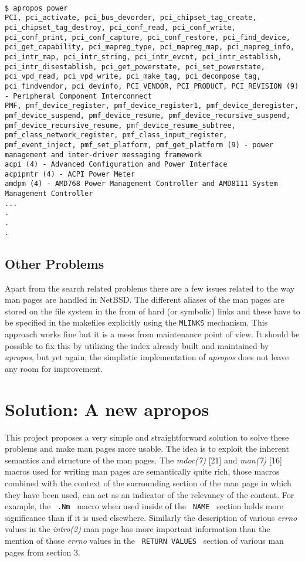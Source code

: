 \documentclass[letterpaper,twocolumn,10pt]{article}
\begin{document}
{\tt \small
{}
\begin{lstlisting}
$ apropos power
PCI, pci_activate, pci_bus_devorder, pci_chipset_tag_create,
pci_chipset_tag_destroy, pci_conf_read, pci_conf_write,
pci_conf_print, pci_conf_capture, pci_conf_restore, pci_find_device,
pci_get_capability, pci_mapreg_type, pci_mapreg_map, pci_mapreg_info,
pci_intr_map, pci_intr_string, pci_intr_evcnt, pci_intr_establish,
pci_intr_disestablish, pci_get_powerstate, pci_set_powerstate,
pci_vpd_read, pci_vpd_write, pci_make_tag, pci_decompose_tag,
pci_findvendor, pci_devinfo, PCI_VENDOR, PCI_PRODUCT, PCI_REVISION (9)
- Peripheral Component Interconnect
PMF, pmf_device_register, pmf_device_register1, pmf_device_deregister,
pmf_device_suspend, pmf_device_resume, pmf_device_recursive_suspend,
pmf_device_recursive_resume, pmf_device_resume_subtree,
pmf_class_network_register, pmf_class_input_register,
pmf_event_inject, pmf_set_platform, pmf_get_platform (9) - power
management and inter-driver messaging framework
acpi (4) - Advanced Configuration and Power Interface
acpipmtr (4) - ACPI Power Meter
amdpm (4) - AMD768 Power Management Controller and AMD8111 System
Management Controller
...
.
.
.
\end{lstlisting}
}

\subsection{Other Problems}
Apart from the search related problems there are a few issues related to
the way man pages are handled in NetBSD. The different aliases of the man pages
are stored on the file system in the from of hard (or symbolic) links and these
have to be specified in the makefiles explicitly using the {\tt MLINKS}
mechanism. This
approach works fine but it is a mess from maintenance point of view.
It should be possible to fix this by utilizing the index already built and
maintained by \textit{apropos}, but yet again, the simplistic implementation of
\textit{apropos} does not leave any room for improvement.

\section{Solution: A new apropos}
This project proposes a very simple and straightforward solution to solve these
problems and make man pages more usable. The idea is to exploit the inherent
semantics and structure of the man pages. The \textit{mdoc(7)} [21] and
\textit{man(7)} [16] macros used for writing man pages are semantically quite
rich, those macros combined with the context of the surrounding section of the
man page in which they have been used, can act
as an indicator of the relevancy of the content. For example, the
{\tt \small
.Nm
}
macro when used inside of the
{\tt \small
NAME
}
section holds more significance than if it is used elsewhere. Similarly the description of various \textit{errno} values in the
\textit{intro(2)} man page has more important information than the mention of
those \textit{errno} values in the
{\tt \small
RETURN VALUES
}
section of various man pages from section 3. \\
\end{document}
